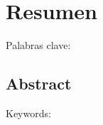 \cleardoublepage
\chapter*{Resumen}
\lipsum[1-2]
\vskip0.5cm
Palabras clave:

\begin{otherlanguage}{english}
    \cleardoublepage
    \chapter*{Abstract}
    \lipsum[1-2]
    \vskip0.5cm
    Keywords:
\end{otherlanguage}

